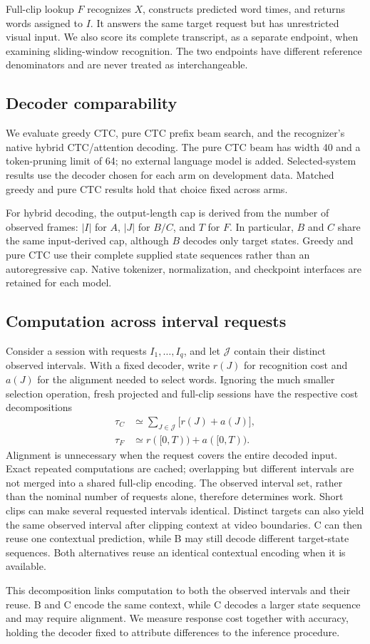 Full-clip lookup \(F\) recognizes \(X\), constructs predicted word times, and
returns words assigned to \(I\). It answers the same target request but has
unrestricted visual input. We also score its complete transcript, as a separate
endpoint, when examining sliding-window recognition. The two endpoints have
different reference denominators and are never treated as interchangeable.

\subsection{Decoder comparability}
We evaluate greedy CTC, pure CTC prefix beam search, and the recognizer's native
hybrid CTC/attention decoding. The pure CTC beam has width 40 and a token-pruning
limit of 64; no external language model is added. Selected-system results use
the decoder chosen for each arm on development data. Matched greedy and pure
CTC results hold that choice fixed across arms.

For hybrid decoding, the output-length cap is derived from the number of
observed frames: \(|I|\) for \(A\), \(|J|\) for \(B/C\), and \(T\) for \(F\).
In particular, \(B\) and \(C\) share the same input-derived cap, although \(B\)
decodes only target states. Greedy and pure CTC use their complete supplied
state sequences rather than an autoregressive cap. Native tokenizer,
normalization, and checkpoint interfaces are retained for each model.

\subsection{Computation across interval requests}
\label{sec:query-computation}
Consider a session with requests \(I_1,\ldots,I_q\), and let
\(\mathcal{J}\) contain their distinct observed intervals. With a fixed
decoder, write \(r(J)\) for recognition cost and \(a(J)\) for the alignment
needed to select words. Ignoring the much smaller selection operation, fresh
projected and full-clip sessions have the respective cost decompositions
\begin{align}
 \tau_C &\simeq \sum_{J\in\mathcal{J}}\bigl[r(J)+a(J)\bigr],\\
 \tau_F &\simeq r([0,T))+a([0,T)).
\end{align}
Alignment is unnecessary when the request covers the entire decoded input.
Exact repeated computations are cached; overlapping but different intervals
are not merged into a shared full-clip encoding. The observed interval set,
rather than the nominal number of requests alone, therefore determines work.
Short clips can make several requested intervals identical.
Distinct targets can also yield the same observed interval after clipping
context at video boundaries. C can then reuse one contextual prediction,
while B may still decode different target-state sequences. Both alternatives
reuse an identical contextual encoding when it is available.

This decomposition links computation to both the observed intervals and their
reuse. B and C encode the same context, while C decodes a larger state sequence
and may require alignment. We measure response cost together with accuracy,
holding the decoder fixed to attribute differences to the inference procedure.
